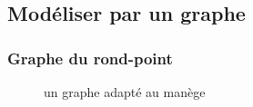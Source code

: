 \documentclass[slidetop,11pt]{beamer}
\begin{document}
	\subsection{Modéliser par un graphe}
\begin{frame}
	\frametitle{Graphe du rond-point}
	\begin{figure}
		\begin{center}
		\end{center}
		\caption{un graphe adapté au manège}
	\end{figure}
\end{frame}
\end{document}
